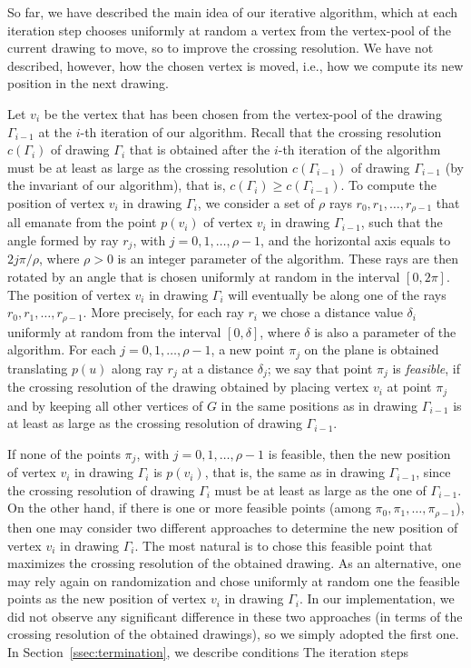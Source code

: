 \documentclass{llncs}
\begin{document}
So far, we have described the main idea of our iterative algorithm, which at each iteration step chooses uniformly at random a vertex from the vertex-pool of the current drawing to move, so to improve the crossing resolution. We have not described, however, how the chosen vertex is moved, i.e., how we compute its new position in the next drawing.  

Let $v_i$ be the vertex that has been chosen from the vertex-pool of the drawing $\Gamma_{i-1}$ at the $i$-th iteration of our algorithm. Recall that the crossing resolution $c(\Gamma_{i})$ of drawing $\Gamma_{i}$ that is obtained after the $i$-th iteration of the algorithm must be at least as large as the crossing resolution $c(\Gamma_{i-1})$ of drawing $\Gamma_{i-1}$ (by the invariant of our algorithm), that is, $c(\Gamma_i) \ge c(\Gamma_{i-1})$. To compute the position of vertex $v_i$ in drawing $\Gamma_i$, we consider a set of $\rho$ rays $r_0,r_1,\ldots,r_{\rho-1}$ that all emanate from the point $p(v_i)$ of vertex $v_i$ in drawing $\Gamma_{i-1}$, such that the angle formed by ray $r_j$, with $j=0,1,\ldots,\rho-1$, and the horizontal axis equals to $2j\pi/\rho$, where $\rho>0$ is an integer parameter of the algorithm. These rays are then rotated by an angle that is chosen uniformly at random in the interval $[0,2\pi]$. The position of vertex $v_i$ in drawing $\Gamma_i$ will eventually be along one of the rays $r_0,r_1,\ldots,r_{\rho-1}$. More precisely, for each ray $r_i$ we chose a distance value $\delta_i$ uniformly at random from the interval $[0,\delta]$, where $\delta$ is also a parameter of the algorithm. For each $j=0,1,\ldots,\rho-1$, a new point $\pi_j$ on the plane is obtained translating $p(u)$ along ray $r_j$ at a distance $\delta_j$; we say that point $\pi_j$ is \emph{feasible}, if the crossing resolution of the drawing obtained by placing vertex $v_i$ at point $\pi_j$ and by keeping all other vertices of $G$ in the same positions as in drawing $\Gamma_{i-1}$ is at least as large as the crossing resolution of drawing $\Gamma_{i-1}$. 

If none of the points $\pi_j$, with $j=0,1,\ldots,\rho-1$ is feasible, then the new position of vertex $v_i$ in drawing $\Gamma_i$ is $p(v_i)$, that is, the same as in drawing $\Gamma_{i-1}$, since the crossing resolution of drawing $\Gamma_i$ must be at least as large as the one of $\Gamma_{i-1}$. On the other hand, if there is one or more feasible points (among $\pi_0,\pi_1,\ldots,\pi_{\rho-1}$), then one may consider two different approaches to determine the new position of vertex $v_i$ in drawing $\Gamma_i$. The most natural is to chose this feasible point that maximizes the crossing resolution of the obtained drawing. As an alternative, one may rely again on randomization and chose uniformly at random one the feasible points as the new position of vertex $v_i$ in drawing $\Gamma_i$. In our implementation, we did not observe any significant difference in these two approaches (in terms of the crossing resolution of the obtained drawings), so we simply adopted the first one. In Section~\ref{ssec:termination}, we describe conditions  The iteration steps
 
\end{document}
